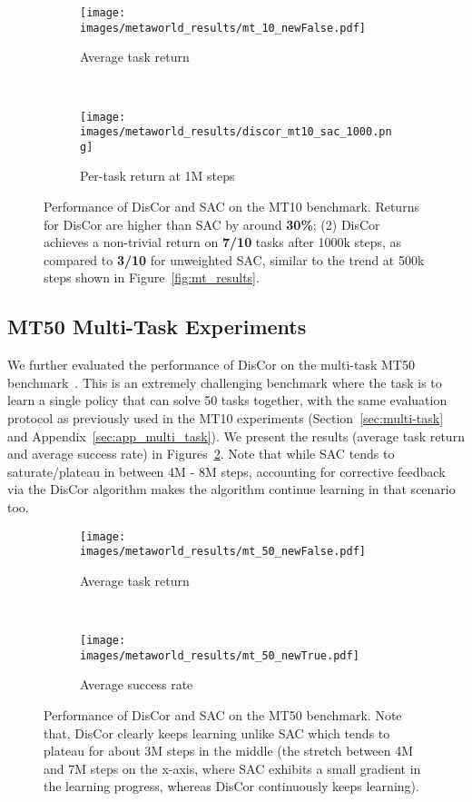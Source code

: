 \documentclass[jmlr]{article}
\begin{document}
\begin{figure}[H]
    \centering
    \begin{subfigure}[t]{.44\linewidth}
        \centering
        \texttt{[image: images/metaworld\_results/mt\_10\_newFalse.pdf]}
        \caption{\footnotesize{Average task return}}
    \end{subfigure}
    ~
    \begin{subfigure}[t]{.47\linewidth}
        \centering
        \texttt{[image: images/metaworld\_results/discor\_mt10\_sac\_1000.png]}
        \caption{\footnotesize{Per-task return at 1M steps}} 
    \end{subfigure}
    \caption{\footnotesize{Performance of DisCor and SAC on the MT10 benchmark. Returns for DisCor are higher than SAC by around \textbf{30\%}; (2) DisCor achieves a non-trivial return on \textbf{7/10} tasks after 1000k steps, as compared to \textbf{3/10} for unweighted SAC, similar to the trend at 500k steps shown in Figure~\ref{fig:mt_results}.}}
    \label{fig:app_mt10}
\end{figure}


\subsection{MT50 Multi-Task Experiments}
\label{sec:app_multi_task_ablation}
We further evaluated the performance of DisCor on the multi-task MT50 benchmark~\citep{yu2019meta}. This is an extremely challenging benchmark where the task is to learn a single policy that can solve 50 tasks together, with the same evaluation protocol as previously used in the MT10 experiments (Section~\ref{sec:multi-task} and Appendix~\ref{sec:app_multi_task}). We present the results (average task return and average success rate) in Figures~\ref{fig:app_mt50}. Note that while SAC tends to saturate/plateau in between 4M - 8M steps, accounting for corrective feedback via the DisCor algorithm makes the algorithm continue learning in that scenario too.    

\begin{figure}[H]
    \centering
    \begin{subfigure}[t]{.47\linewidth}
        \centering
        \texttt{[image: images/metaworld\_results/mt\_50\_newFalse.pdf]}
        \caption{\footnotesize{Average task return}}
    \end{subfigure}
    ~
    \begin{subfigure}[t]{.47\linewidth}
        \centering
        \texttt{[image: images/metaworld\_results/mt\_50\_newTrue.pdf]}
        \caption{\footnotesize{Average success rate}} 
    \end{subfigure}
    \caption{\footnotesize{Performance of DisCor and SAC on the MT50 benchmark. Note that, DisCor clearly keeps learning unlike SAC which tends to plateau for about 3M steps in the middle (the stretch between 4M and 7M steps on the x-axis, where SAC exhibits a small gradient in the learning progress, whereas DisCor continuously keeps learning).}}
    \label{fig:app_mt50}
\end{figure}
\end{document}
